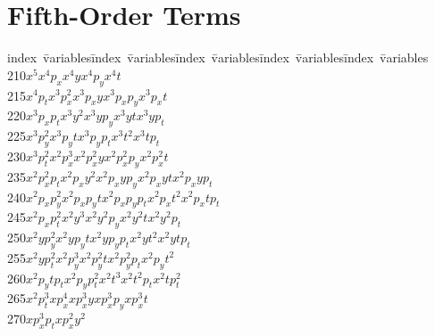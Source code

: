 \section{Fifth-Order Terms}
\indent
\begin{tabbing}
index\ \=variables\kern1cm\=index\ \=variables\kern1cm\=
index\ \=variables\kern1cm\=index\ \=variables\kern1cm\=
index\ \=variables\\
210\>$x  ^5             $\>$x  ^4 p_x         $\>$x  ^4 y           $\>$x  ^4 p_y         $\>$x  ^4 t           $\\
215\>$x  ^4 p_t         $\>$x  ^3 p_x^2       $\>$x  ^3 p_xy        $\>$x  ^3 p_xp_y      $\>$x  ^3 p_xt        $\\
220\>$x  ^3 p_xp_t      $\>$x  ^3 y  ^2       $\>$x  ^3 y  p_y      $\>$x  ^3 y  t        $\>$x  ^3 y  p_t      $\\
225\>$x  ^3 p_y^2       $\>$x  ^3 p_yt        $\>$x  ^3 p_yp_t      $\>$x  ^3 t  ^2       $\>$x  ^3 t  p_t      $\\
230\>$x  ^3 p_t^2       $\>$x  ^2 p_x^3       $\>$x  ^2 p_x^2 y     $\>$x  ^2 p_x^2 p_y   $\>$x  ^2 p_x^2 t     $\\
235\>$x  ^2 p_x^2 p_t   $\>$x  ^2 p_xy  ^2    $\>$x  ^2 p_xy  p_y   $\>$x  ^2 p_xy  t     $\>$x  ^2 p_xy  p_t   $\\
240\>$x  ^2 p_xp_y^2    $\>$x  ^2 p_xp_yt     $\>$x  ^2 p_xp_yp_t   $\>$x  ^2 p_xt  ^2    $\>$x  ^2 p_xt  p_t   $\\
245\>$x  ^2 p_xp_t^2    $\>$x  ^2 y  ^3       $\>$x  ^2 y  ^2 p_y   $\>$x  ^2 y  ^2 t     $\>$x  ^2 y  ^2 p_t   $\\
250\>$x  ^2 y  p_y^2    $\>$x  ^2 y  p_yt     $\>$x  ^2 y  p_yp_t   $\>$x  ^2 y  t  ^2    $\>$x  ^2 y  t  p_t   $\\
255\>$x  ^2 y  p_t^2    $\>$x  ^2 p_y^3       $\>$x  ^2 p_y^2 t     $\>$x  ^2 p_y^2 p_t   $\>$x  ^2 p_yt  ^2    $\\
260\>$x  ^2 p_yt  p_t   $\>$x  ^2 p_yp_t^2    $\>$x  ^2 t  ^3       $\>$x  ^2 t  ^2 p_t   $\>$x  ^2 t  p_t^2    $\\
265\>$x  ^2 p_t^3       $\>$x  p_x^4          $\>$x  p_x^3 y        $\>$x  p_x^3 p_y      $\>$x  p_x^3 t        $\\
270\>$x  p_x^3 p_t      $\>$x  p_x^2 y  ^2    $\>

\end{tabbing}
